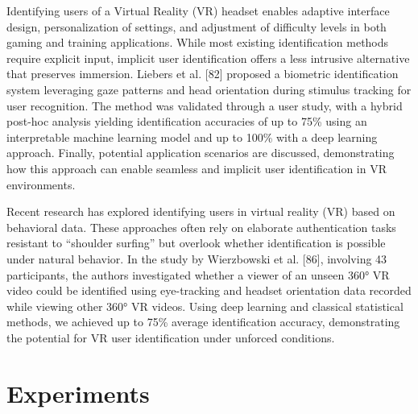 \documentclass[12pt]{report}
\begin{document}
Identifying users of a Virtual Reality (VR) headset enables adaptive interface design, personalization of settings, and adjustment of difficulty levels in both gaming and training applications.
While most existing identification methods require explicit input, implicit user identification offers a less intrusive alternative that preserves immersion.
Liebers et al. [82] proposed a biometric identification system leveraging gaze patterns and head orientation during stimulus tracking for user recognition.
The method was validated through a user study, with a hybrid post-hoc analysis yielding identification accuracies of up to 75\% using an interpretable machine learning model and up to 100\% with a deep learning approach.
Finally, potential application scenarios are discussed, demonstrating how this approach can enable seamless and implicit user identification in VR environments.

Recent research has explored identifying users in virtual reality (VR) based on behavioral data. 
These approaches often rely on elaborate authentication tasks resistant to “shoulder surfing” but overlook whether identification is possible under natural behavior.
In the study by Wierzbowski et al. [86], involving 43 participants, the authors investigated whether a viewer of an unseen 360° VR video could be identified using eye-tracking and headset orientation data recorded while viewing other 360° VR videos.
Using deep learning and classical statistical methods, we achieved up to 75\% average identification accuracy, demonstrating the potential for VR user identification under unforced conditions.
\newpage

\chapter{Experiments}
\end{document}
